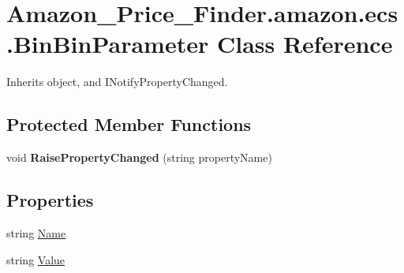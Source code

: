 \hypertarget{class_amazon___price___finder_1_1amazon_1_1ecs_1_1_bin_bin_parameter}{\section{Amazon\-\_\-\-Price\-\_\-\-Finder.\-amazon.\-ecs.\-Bin\-Bin\-Parameter Class Reference}
\label{class_amazon___price___finder_1_1amazon_1_1ecs_1_1_bin_bin_parameter}
}


 




Inherits object, and I\-Notify\-Property\-Changed.

\subsection*{Protected Member Functions}
\begin{DoxyCompactItemize}
\item 
\hypertarget{class_amazon___price___finder_1_1amazon_1_1ecs_1_1_bin_bin_parameter_ae7be5522df9a3b1d969e6f009933b609}{void {\bfseries Raise\-Property\-Changed} (string property\-Name)}\label{class_amazon___price___finder_1_1amazon_1_1ecs_1_1_bin_bin_parameter_ae7be5522df9a3b1d969e6f009933b609}

\end{DoxyCompactItemize}
\subsection*{Properties}
\begin{DoxyCompactItemize}
\item 
\hypertarget{class_amazon___price___finder_1_1amazon_1_1ecs_1_1_bin_bin_parameter_a11ccea4bb761aecedbcd807c6bedfa2d}{string \hyperlink{class_amazon___price___finder_1_1amazon_1_1ecs_1_1_bin_bin_parameter_a11ccea4bb761aecedbcd807c6bedfa2d}{Name}}\label{class_amazon___price___finder_1_1amazon_1_1ecs_1_1_bin_bin_parameter_a11ccea4bb761aecedbcd807c6bedfa2d}

\begin{DoxyCompactList}\small\item\em \end{DoxyCompactList}\item 
\hypertarget{class_amazon___price___finder_1_1amazon_1_1ecs_1_1_bin_bin_parameter_a2a31aff4beaeb74414688c400413a08e}{string \hyperlink{class_amazon___price___finder_1_1amazon_1_1ecs_1_1_bin_bin_parameter_a2a31aff4beaeb74414688c400413a08e}{Value}}\label{class_amazon___price___finder_1_1amazon_1_1ecs_1_1_bin_bin_parameter_a2a31aff4beaeb74414688c400413a08e}

\begin{DoxyCompactList}\small\item\em \end{DoxyCompactList}\end{DoxyCompactItemize}
